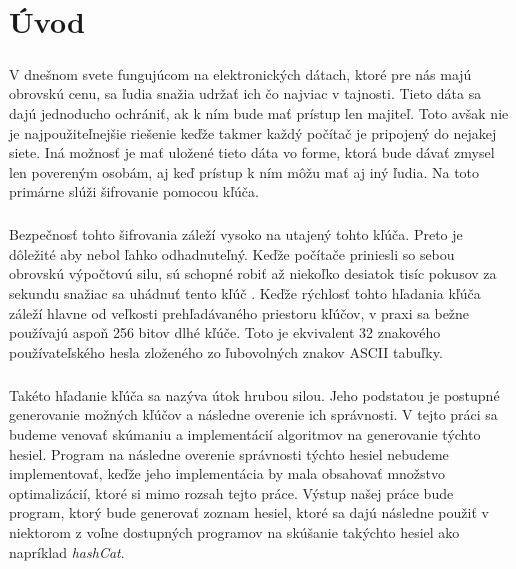 \chapter*{Úvod}
\paragraph{}
V dnešnom svete fungujúcom na elektronických dátach, ktoré pre nás majú obrovskú cenu, sa ľudia snažia udržať ich čo najviac v tajnosti. Tieto dáta sa dajú jednoducho ochrániť, ak k ním bude mať prístup len majiteľ. Toto avšak nie je najpoužiteľnejšie riešenie keďže takmer každý počítač je pripojený do nejakej siete. Iná možnosť je mať uložené tieto dáta vo forme, ktorá bude dávať zmysel len povereným osobám, aj keď prístup k ním môžu mať aj iný ľudia. Na toto primárne slúži šifrovanie pomocou kľúča. 

\paragraph{}
Bezpečnosť tohto šifrovania záleží vysoko na utajený tohto kľúča. Preto je dôležité aby nebol ľahko odhadnuteľný. Keďže počítače priniesli so sebou obrovskú výpočtovú silu, sú schopné robiť až niekoľko desiatok tisíc pokusov za sekundu snažiac sa uhádnuť tento kľúč \cite{gpu25}. Keďže rýchlosť tohto hľadania kľúča záleží hlavne od veľkosti prehľadávaného priestoru kľúčov, v praxi sa bežne používajú aspoň 256 bitov dlhé kľúče. Toto je ekvivalent 32 znakového používateľského hesla zloženého zo ľubovolných znakov ASCII tabuľky.

\paragraph{}
Takéto hľadanie kľúča sa nazýva útok hrubou silou. Jeho podstatou je postupné generovanie možných kľúčov a následne overenie ich správnosti. V tejto práci sa budeme venovať skúmaniu a implementácií algoritmov na generovanie týchto hesiel. Program na následne overenie správnosti týchto hesiel nebudeme implementovať, keďže jeho implementácia by mala obsahovať množstvo optimalizácií, ktoré si mimo rozsah tejto práce. Výstup našej práce bude program, ktorý bude generovať zoznam hesiel, ktoré sa dajú následne použiť v niektorom z voľne dostupných programov na skúšanie takýchto hesiel ako napríklad \emph{hashCat}.